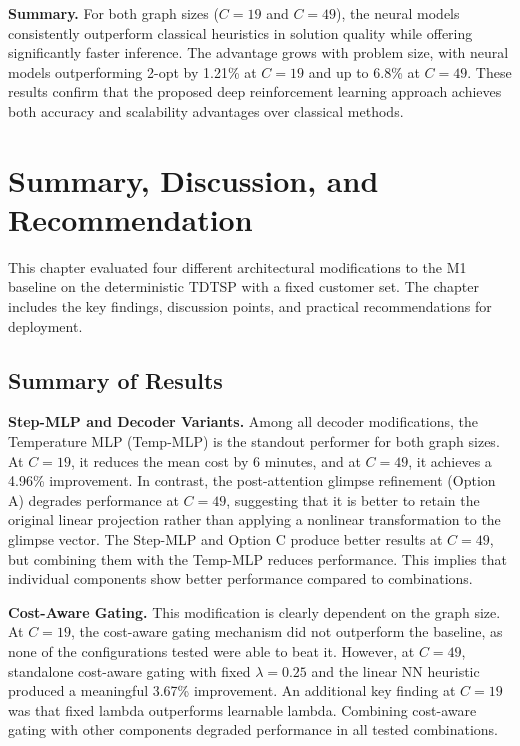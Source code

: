 \textbf{Summary.} For both graph sizes ($C = 19$ and $C = 49$), the neural models consistently outperform
classical heuristics in solution quality while offering significantly faster inference. The
advantage grows with problem size, with neural models outperforming 2-opt by 1.21\% at
$C = 19$ and up to 6.8\% at $C = 49$. These results confirm that the proposed deep
reinforcement learning approach achieves both accuracy and scalability advantages over
classical methods.

\section{Summary, Discussion, and Recommendation}
\label{sec:exp_summary_final}

This chapter evaluated four different architectural modifications to the M1 baseline on the
deterministic TDTSP with a fixed customer set. The chapter includes the key findings,
discussion points, and practical recommendations for deployment.

\subsection{Summary of Results}
\label{subsec:summary_of_results}

\textbf{Step-MLP and Decoder Variants.}
Among all decoder modifications, the Temperature MLP (Temp-MLP) is the standout performer
for both graph sizes. At $C = 19$, it reduces the mean cost by 6 minutes, and at $C = 49$,
it achieves a 4.96\% improvement. In contrast, the post-attention glimpse refinement (Option
A) degrades performance at $C = 49$, suggesting that it is better to retain the original
linear projection rather than applying a nonlinear transformation to the glimpse vector. The
Step-MLP and Option C produce better results at $C = 49$, but combining them with the
Temp-MLP reduces performance. This implies that individual components show better performance
compared to combinations.

\textbf{Cost-Aware Gating.}
This modification is clearly dependent on the graph size. At $C = 19$, the cost-aware gating
mechanism did not outperform the baseline, as none of the configurations tested were able to
beat it. However, at $C = 49$, standalone cost-aware gating with fixed $\lambda = 0.25$ and
the linear NN heuristic produced a meaningful 3.67\% improvement. An additional key finding
at $C = 19$ was that fixed lambda outperforms learnable lambda. Combining cost-aware gating
with other components degraded performance in all tested combinations.

